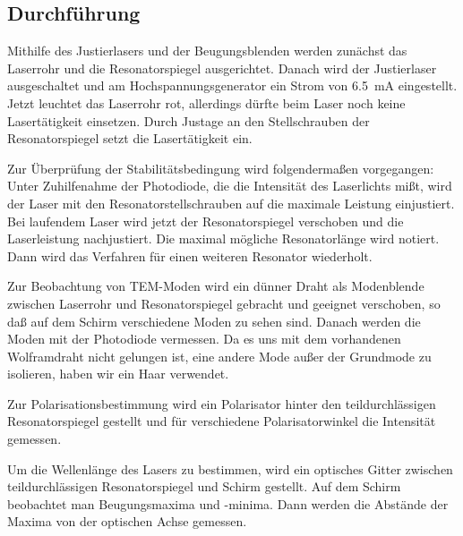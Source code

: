 \subsection{Durchführung}
Mithilfe des Justierlasers und der Beugungsblenden werden zunächst das
Laserrohr und die Resonatorspiegel ausgerichtet.  Danach wird der
Justierlaser ausgeschaltet und am Hochspannungsgenerator ein Strom von
\SI{6.5}{mA} eingestellt.  Jetzt leuchtet das Laserrohr rot, allerdings
dürfte beim Laser noch keine Lasertätigkeit einsetzen.  Durch Justage an
den Stellschrauben der Resonatorspiegel setzt die Lasertätigkeit ein.

Zur Überprüfung der Stabilitätsbedingung wird folgendermaßen
vorgegangen:  Unter Zuhilfenahme der Photodiode, die die Intensität des
Laserlichts mißt, wird der Laser mit den Resonatorstellschrauben auf die
maximale Leistung einjustiert.  Bei laufendem Laser wird jetzt der
Resonatorspiegel verschoben und die Laserleistung nachjustiert.  Die
maximal mögliche Resonatorlänge wird notiert.  Dann wird das Verfahren
für einen weiteren Resonator wiederholt.

Zur Beobachtung von TEM-Moden wird ein dünner Draht als Modenblende
zwischen Laserrohr und Resonatorspiegel gebracht und geeignet
verschoben, so daß auf dem Schirm verschiedene Moden zu sehen sind.
Danach werden die Moden mit der Photodiode vermessen.  Da es uns mit dem
vorhandenen Wolframdraht nicht gelungen ist, eine andere Mode außer der
Grundmode zu isolieren, haben wir ein Haar verwendet.

Zur Polarisationsbestimmung wird ein Polarisator hinter den
teildurchlässigen Resonatorspiegel gestellt und für verschiedene
Polarisatorwinkel die Intensität gemessen.

Um die Wellenlänge des Lasers zu bestimmen, wird ein optisches Gitter
zwischen teildurchlässigen Resonatorspiegel und Schirm gestellt.  Auf
dem Schirm beobachtet man Beugungsmaxima und -minima.  Dann werden die
Abstände der Maxima von der optischen Achse gemessen.
